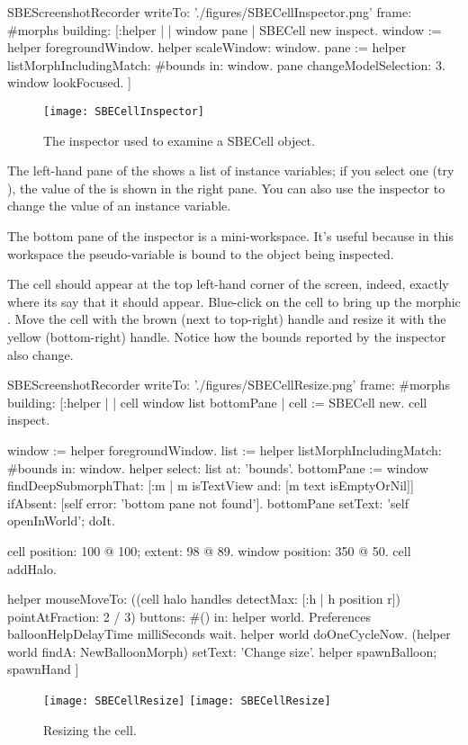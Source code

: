 \documentclass[a4paper,10pt,twoside]{book}
\begin{document}
\begin{ExecuteSmalltalkScript}
SBEScreenshotRecorder writeTo: './figures/SBECellInspector.png' frame: #morphs building: [:helper |
	| window pane |
	SBECell new inspect.
	window := helper foregroundWindow.
	helper scaleWindow: window.
	pane := helper listMorphIncludingMatch: #bounds in: window.
	pane changeModelSelection: 3.
	window lookFocused.
]
\end{ExecuteSmalltalkScript}
\begin{figure}[htbp]
   \centering
   \texttt{[image: SBECellInspector]}
   \caption{The inspector used to examine a SBECell object.\label{fig:SBECellInspector}}
\end{figure}

The left-hand pane of the  shows a list of instance variables; if you select one (try \mbox{),} the value of the  is shown in the right pane.
You can also use the inspector to change the value of an instance variable.


The bottom pane of the inspector is a mini-workspace.
It's useful because in this workspace the pseudo-variable \self is bound to the object being inspected.

The cell should appear at the top left-hand corner of the screen, indeed, exactly where its  say that it should appear.
Blue-click on the cell to bring up the morphic .
Move the cell with the brown (next to top-right) handle and resize it with the yellow (bottom-right) handle.
Notice how the bounds reported by the inspector also change.

\begin{ExecuteSmalltalkScript}
SBEScreenshotRecorder writeTo: './figures/SBECellResize.png' frame: #morphs building: [:helper |
	| cell window list bottomPane |
	cell := SBECell new.
	cell inspect.

	window := helper foregroundWindow.
	list := helper listMorphIncludingMatch: #bounds in: window.
	helper select: list at: 'bounds'.
	bottomPane := window findDeepSubmorphThat: [:m | m isTextView and: [m text isEmptyOrNil]] ifAbsent: [self error: 'bottom pane not found'].
	bottomPane setText: 'self openInWorld'; doIt.

	cell position: 100 @ 100; extent: 98 @ 89.
	window position: 350 @ 50.
	cell addHalo.

	helper mouseMoveTo: ((cell halo handles detectMax: [:h | h position r]) pointAtFraction: 2 / 3) buttons: #() in: helper world.
	Preferences balloonHelpDelayTime milliSeconds wait.
	helper world doOneCycleNow.
	(helper world findA: NewBalloonMorph) setText: 'Change size'.
	helper spawnBalloon; spawnHand
]
\end{ExecuteSmalltalkScript}
\begin{figure}[htbp]
\centering
\ifluluelse
	{\texttt{[image: SBECellResize]} }
	{\texttt{[image: SBECellResize]} }
\caption{Resizing the cell.\label{fig:cellresize}}
\end{figure}
\end{document}
